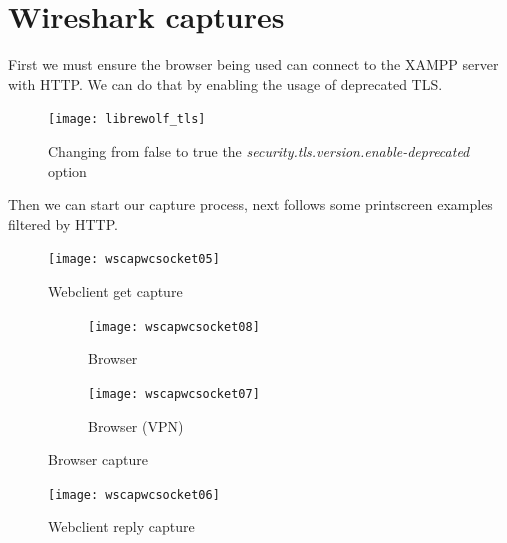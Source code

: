 \documentclass[11pt,a4paper]{report}
\begin{document}
    \section{Wireshark captures}
        \begin{flushleft}
            First we must ensure the browser being used can connect to the XAMPP server with HTTP. We can do that by enabling the usage of deprecated TLS.
            \clearpage
            \begin{figure}[h]
                \centering
                \texttt{[image: librewolf\_tls]} 
                \caption{Changing from false to true the \textit{security.tls.version.enable-deprecated} option}
                \label{fig:librewolf}
            \end{figure}

            Then we can start our capture process, next follows some printscreen examples filtered by HTTP.
            \begin{flushleft}
                \begin{figure}[h]
                    \centering
                    \texttt{[image: wscapwcsocket05]} %
                    \caption{Webclient get capture} \label{fig:wireshark1}
                \end{figure}
                
                \begin{figure}[t]
                    \centering
                        \begin{subfigure}{0.49\linewidth} \centering
                            \texttt{[image: wscapwcsocket08]} %
                            \caption{Browser} \label{fig:wireshark4}
                        \end{subfigure}
                        \begin{subfigure}{0.49\linewidth} \centering
                            \texttt{[image: wscapwcsocket07]} %
                            \caption{Browser (VPN)} \label{fig:wireshark3}
                        \end{subfigure}
                    \caption{Browser capture} \label{fig:twobrowsers}
                    \end{figure}

                \begin{figure}
                    \centering
                    \texttt{[image: wscapwcsocket06]} %
                    \caption{Webclient reply capture} \label{fig:wireshark2}
                \end{figure}
            \end{flushleft}
            

\end{flushleft}
\end{document}
